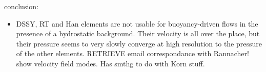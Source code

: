 
conclusion:

\begin{itemize}
\item DSSY, RT and Han elements are not usable for buoyancy-driven flows in the presence of a hydrostatic 
background. Their velocity is all over the place, but their pressure seems to very slowly 
converge at high resolution to the pressure of the other elements.
RETRIEVE email correspondance with Rannacher! show velocity field modes. Has smthg to do with 
Korn stuff.
\end{itemize}














